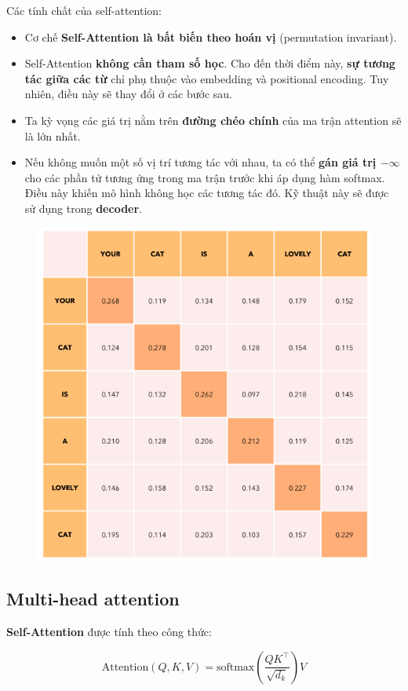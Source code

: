 \documentclass{book}
\begin{document}
            Các tính chất của self-attention:
            \begin{itemize}
              \item Cơ chế \textbf{Self-Attention là bất biến theo hoán vị} (permutation invariant).
              
              \item Self-Attention \textbf{không cần tham số học}. Cho đến thời điểm này, \textbf{sự tương tác giữa các từ} chỉ phụ thuộc vào embedding và positional encoding. Tuy nhiên, điều này sẽ thay đổi ở các bước sau.
              
              \item Ta kỳ vọng các giá trị nằm trên \textbf{đường chéo chính} của ma trận attention sẽ là lớn nhất.
              
              \item Nếu không muốn một số vị trí tương tác với nhau, ta có thể \textbf{gán giá trị $-\infty$} cho các phần tử tương ứng trong ma trận trước khi áp dụng hàm softmax. Điều này khiến mô hình không học các tương tác đó. Kỹ thuật này sẽ được sử dụng trong \textbf{decoder}.
            \end{itemize}
            \begin{figure}[H]
                \centering
                \includegraphics[width=0.5  \linewidth]{images/12d_12.png}
        
            \end{figure}
            \subsection*{Multi-head attention}

            \textbf{Self-Attention} được tính theo công thức:

            \[
            \text{Attention}(Q, K, V) = \text{softmax}\left( \frac{Q K^\top}{\sqrt{d_k}} \right) V
            \]
            
\end{document}
